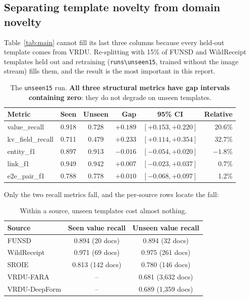 \documentclass[11pt,a4paper]{article}
\newcommand{\code}[1]{\texttt{\small #1}}
\begin{document}
\subsection{Separating template novelty from domain novelty}
\label{sec:unseen15}

Table~\ref{tab:main} cannot fill its last three columns because every held-out template comes
from VRDU. Re-splitting with 15\% of FUNSD and WildReceipt templates held out and retraining
(\code{runs\textbackslash unseen15}, trained without the image stream) fills them, and the result is the most important in this
report.

\begin{table}[htbp]
\centering\small
\begin{tabular}{@{}lccrcr@{}}
\toprule
\textbf{Metric} & \textbf{Seen} & \textbf{Unseen} & \textbf{Gap} & \textbf{95\% CI} &
\textbf{Relative} \\
\midrule
value\_recall     & 0.918 & 0.728 & $+0.189$ & $[+0.153, +0.220]$ & 20.6\% \\
kv\_field\_recall & 0.711 & 0.479 & $+0.233$ & $[+0.114, +0.354]$ & 32.7\% \\
entity\_f1        & 0.897 & 0.913 & $-0.016$ & $[-0.054, +0.020]$ & $-1.8$\% \\
link\_f1          & 0.949 & 0.942 & $+0.007$ & $[-0.023, +0.037]$ & 0.7\% \\
e2e\_pair\_f1     & 0.788 & 0.778 & $+0.010$ & $[-0.068, +0.097]$ & 1.2\% \\
\bottomrule
\end{tabular}
\caption{The \code{unseen15} run. \textbf{All three structural metrics have gap intervals
containing zero}: they do not degrade on unseen templates.}
\label{tab:unseen15}
\end{table}

Only the two recall metrics fall, and the per-source rows locate the fall:

\begin{table}[htbp]
\centering\small
\begin{tabular}{@{}lcc@{}}
\toprule
\textbf{Source} & \textbf{Seen value recall} & \textbf{Unseen value recall} \\
\midrule
FUNSD        & 0.894 (20 docs)  & 0.894 (32 docs) \\
WildReceipt  & 0.971 (69 docs)  & 0.975 (261 docs) \\
SROIE        & 0.813 (142 docs) & 0.780 (146 docs) \\
VRDU-FARA    & --               & 0.681 (3{,}632 docs) \\
VRDU-DeepForm& --               & 0.689 (1{,}359 docs) \\
\bottomrule
\end{tabular}
\caption{Within a source, unseen templates cost almost nothing.}
\label{tab:persource}
\end{table}
\end{document}
